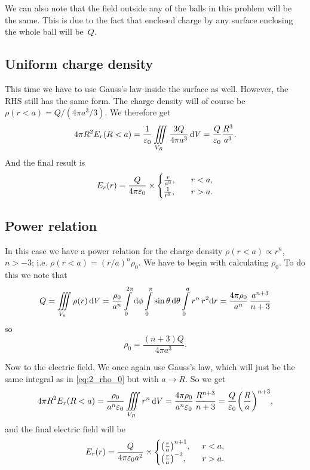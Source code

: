 \documentclass[11pt,letter, swedish, english
]{article}
\let\oldint\int
\renewcommand{\int}{\oldint\limits}
\newcommand{\enaught}{\ensuremath\varepsilon_0}
\begin{document}
We can also note that the field outside any of the balls in this
problem will be the same. This is due to the fact that enclosed charge
by any surface enclosing the whole ball will be~$Q$. 

\subsection{Uniform charge density}
This time we have to use Gauss's law inside the surface as
well. However, the RHS still has the same form. The charge density
will of course be $\rho(r<a)=Q/(4\pi a^3/3)$.
We therefore get
\begin{equation}
4\pi R^2 E_r(R<a)
=\frac{1}{\enaught}\iiint\limits_{V_R}
\frac{3Q}{4\pi a^3}\id{V}
=\frac{Q}{\enaught}\frac{R^3}{a^3}.
\end{equation}
And the final result is
\begin{equation}
E_r(r)=\frac{Q}{4\pi\enaught}\times
\begin{cases}
\frac{r}{a^3}, &r<a,\\
\frac{1}{r^2}\qcomma &r>a.
\end{cases}
\end{equation}

\subsection{Power relation}
In this case we have a power relation for the charge density
$\rho(r<a)\propto r^n$, $n>-3$; i.e. $\rho(r<a)=(r/a)^n\rho_0$. We
have to begin with calculating $\rho_0$. To do this we note that
\begin{equation}\label{eq:2_rho_0}
Q=\iiint\limits_{V_{a}}\rho(r)\id{V}
=\frac{\rho_0}{a^n}\int_0^{2\pi}\rd\phi\int_0^\pi\sin\theta\id\theta
\int_0^a r^n\,r^2\rd{r}
=\frac{4\pi \rho_0}{a^n}\,\frac{a^{n+3}}{n+3}
\end{equation}
so
\begin{equation}
\rho_0=\frac{(n+3)Q}{4\pi a^3}.
\end{equation}

Now to the electric field. We once again use Gauss's law, which will
just be the same integral as in \eqref{eq:2_rho_0} but with 
$a\to R$. So we get
\begin{equation}
4\pi R^2  E_r(R<a)
=\frac{\rho_0}{a^n\enaught}\iiint\limits_{V_R}r^n\id{V}
=\frac{4\pi\rho_0}{a^n\enaught}\,\frac{R^{n+3}}{n+3}
=\frac{Q}{\enaught}\qty(\frac{R}{a})^{n+3},
\end{equation}
and the final electric field will be
\begin{equation}
E_r(r)=\frac{Q}{4\pi\enaught a^2}\times
\begin{cases}
\qty(\frac{r}{a})^{n+1}, &r<a,\\
\qty(\frac{r}{a})^{-2}\qcomma &r>a.
\end{cases}
\end{equation}
\end{document}
